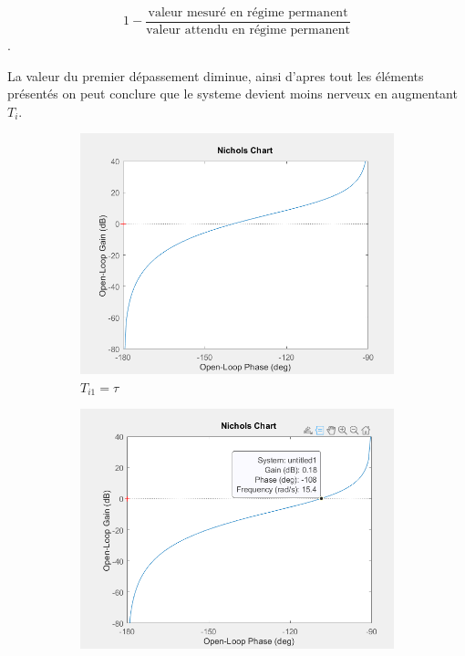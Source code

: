 \documentclass[12pt, a4paper]{report}
\begin{document}
\[
    1 - \frac{\mbox{valeur mesuré en régime permanent}}{\mbox{valeur attendu en régime permanent}} 
\].

La valeur du premier dépassement diminue, ainsi d'apres tout les éléments présentés on peut conclure que le systeme
devient moins nerveux en augmentant $T_i$.

\begin{figure}[H]
    \begin{subfigure}[h!]{0.46\linewidth}
        \includegraphics[width=\linewidth]{diagrammblacks1tau1.png}
        \caption{$T_{i1} = \tau$}
    \end{subfigure}
    \hfill
    \begin{subfigure}[h!]{0.46\linewidth}
        \includegraphics[width=\linewidth]{diagrammblacks1tau5.png}

\end{subfigure}
\end{figure}
\end{document}
